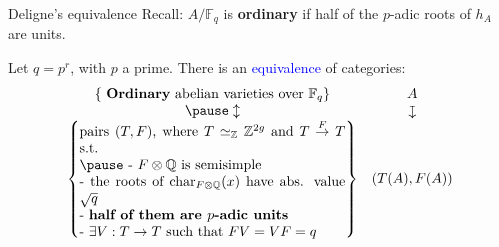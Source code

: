 \documentclass[usenames,dvipsnames]{beamer}
\def\Q{\mathbb{Q}}
\def\Z{\mathbb{Z}}
\def\C{\mathbb{C}}
\def\F{\mathbb{F}}
\DeclareMathOperator{\Char}{char}
\DeclareMathOperator{\End}{End}
\newcommand{\cA}{{\mathcal A}}
\newcommand{\downmapsto}{\rotatebox[origin=c]{-90}{$\large\mapsto$}\mkern2mu} %
\newcommand{\set}[1]{\left\lbrace#1\right\rbrace }
\newcommand{\blue}[1]{\textcolor{blue}{#1}}
\begin{document}
\begin{frame}{ Deligne's equivalence }
	Recall: $A/\F_q$ is {\bf ordinary} if half of the $p$-adic roots of $h_A$ are units.
\pause
	\begin{theorem}[Deligne '69]
	Let $q=p^r$, with $p$ a prime.
	There is an \blue{equivalence} of categories:
	\[ \begin{array}{cc}
	\set{\text{ {\bf Ordinary} abelian varieties over } \F_q } 	& A \\
\pause
    \updownarrow											& \downmapsto \\
	\set{\parbox[p]{19em}{pairs $(T,F)$, where $T\simeq_\Z \Z^{2g}$ and $T\overset{F}{\to} T$ s.t.\\
\pause
	- $F\otimes \Q$ is semisimple\\
	- the roots of $\Char_{F\otimes\Q}(x)$ have abs. value $\sqrt{q}$\\
	- \textbf{half of them are $p$-adic units}\\
	- $\exists V:T\to T$ such that $FV=VF=q$
	}}	& (T(A),F(A))
	\end{array} \]
	\end{theorem}
\end{frame}
\end{document}

